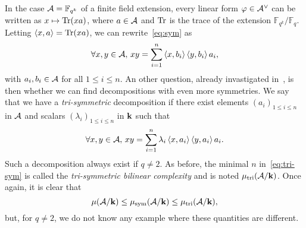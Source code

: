 \documentclass[a4paper,11pt]{article}
\begin{document}
In the case $\mathcal{A}=\mathbb{F}_{q^k}$ of a finite field extension, every linear form
$\varphi\in\mathcal{A}^\vee$ can be written as $x\mapsto\operatorname{Tr}(x a)$, where
$a\in\mathcal{A}$ and $\operatorname{Tr}$ is the trace of the extension
$\mathbb{F}_{q^k}/\mathbb{F}_q$. Letting $\left\langle x,a\right\rangle=\operatorname{Tr}(xa)$, we can
rewrite~\eqref{eq:sym} as
\begin{equation}
  \forall x, y\in\mathcal{A},\,xy = \sum_{i=1}^{n}\left\langle x,b_i\right\rangle\left\langle y,b_i\right\rangle a_i,
  \label{eq:sym-tr}
\end{equation}
with $a_i, b_i\in\mathcal{A}$ for all $1\leq i\leq n$. An other question,
already invastigated in~\cite{SL81}, is then
whether we can find decompositions with even more symmetries. We say that we
have a \emph{tri-symmetric} decomposition if there exist elements $(a_i)_{1\leq i
\leq n}$ in $\mathcal{A}$ and scalars $(\lambda_i)_{1\leq i \leq n}$ in $\mathbf{k}$ such that
\begin{equation}
  \forall x, y\in\mathcal{A},\,xy =
  \sum_{i=1}^{n}\lambda_i\left\langle x,a_i\right\rangle\left\langle y,a_i\right\rangle a_i.
  \label{eq:tri-sym}
\end{equation}
Such a decomposition always exist if $q\neq2$. As before, the minimal $n$
in~\eqref{eq:tri-sym} is called the \emph{tri-symmetric bilinear complexity} and
is noted $\mu_{\text{tri}}(\mathcal{A}/\mathbf{k})$. Once again, it is clear that
\[
  \mu(\mathcal{A}/\mathbf{k}) \leq \mu_{\text{sym}}(\mathcal{A}/\mathbf{k})\leq\mu_{\text{tri}}(\mathcal{A}/\mathbf{k}),
\]
but, for $q\neq2$, we do not know any example where these quantities are
different.
\end{document}
